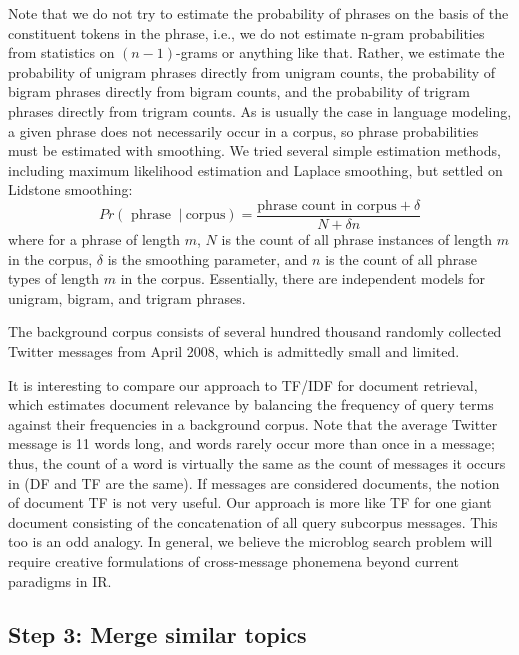 \documentclass[letterpaper]{article}
\newcommand{\bto}[1]{\textcolor{blue}{\textbf{[#1 --BTO]}}}
\begin{document}
Note that we do not try to estimate the probability of phrases on the basis of the constituent tokens in the phrase, i.e., we do not estimate n-gram probabilities from statistics on $(n-1)$-grams or anything like that.  Rather, we estimate the probability of unigram phrases directly from unigram counts, the probability of bigram phrases directly from bigram counts, and the probability of trigram phrases directly from trigram counts.  As is usually the case in language modeling, a given phrase does not necessarily occur in a corpus, so phrase probabilities must be estimated with smoothing.  We tried several simple estimation methods, including maximum likelihood estimation and Laplace smoothing, but settled on Lidstone smoothing:
\[ Pr(\textrm{ phrase }\ |\ \textrm{corpus}) = \frac
{ \textrm{phrase count in corpus} + \delta }
{ N + \delta n }
\]
where for a phrase of length $m$, $N$ is the count of all phrase instances of length $m$ in the corpus, $\delta$ is the smoothing parameter, and $n$ is the count of all phrase types of length $m$ in the corpus.  Essentially, there are independent models for unigram, bigram, and trigram phrases.


The background corpus consists of several hundred thousand randomly collected Twitter messages from April 2008, which is admittedly small and limited.

It is interesting to compare our approach to TF/IDF for document retrieval, which estimates document relevance by balancing the frequency of query terms against their frequencies in a background corpus.  Note that the average Twitter message is 11 words long, and words rarely occur more than once in a message; thus, the count of a word is virtually the same as the count of messages it occurs in (DF and TF are the same).  If messages are considered documents, the notion of document TF is not very useful.  Our approach is more like TF for one giant document consisting of the concatenation of all query subcorpus messages.  This too is an odd analogy.  In general, we believe the microblog search problem will require creative formulations of cross-message phonemena beyond current paradigms in IR.

\subsection{Step 3: Merge similar topics}
\end{document}
